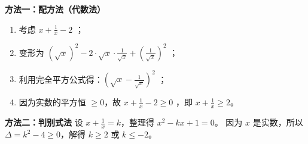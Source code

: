 \begin{proofbox}
\textbf{方法一：配方法（代数法）}
\begin{enumerate}
    \item 考虑 $x + \frac{1}{x} - 2$ ；
    \item 变形为 $(\sqrt{x})^2 - 2 \cdot \sqrt{x} \cdot \frac{1}{\sqrt{x}} + (\frac{1}{\sqrt{x}})^2$ ；
    \item 利用完全平方公式得：$(\sqrt{x} - \frac{1}{\sqrt{x}})^2$ ；
    \item 因为实数的平方恒 $\geqslant 0$，故 $x + \frac{1}{x} - 2 \geqslant 0$ ，即 $x + \frac{1}{x} \geqslant 2$。
\end{enumerate}

\textbf{方法二：判别式法}
设 $x + \frac{1}{x} = k$，整理得 $x^2 - kx + 1 = 0$。
因为 $x$ 是实数，所以 $\Delta = k^2 - 4 \geqslant 0$，解得 $k \geqslant 2$ 或 $k \leqslant -2$。
\end{proofbox}